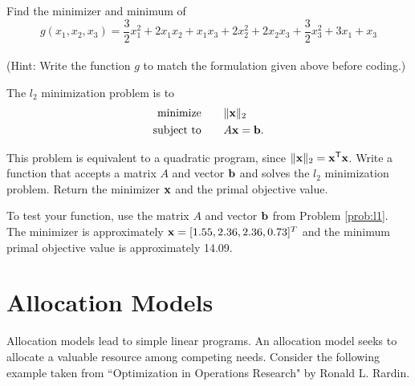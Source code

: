\begin{problem}
Find the minimizer and minimum of
\begin{equation*}
g(x_1,x_2,x_3) = \frac{3}{2}x_1^2 +2x_1x_2 + x_1x_3+ 2x_2^2 +2x_2x_3+\frac{3}{2}x_3^2+3x_1 + x_3
\end{equation*}
\\(Hint: Write the function $g$ to match the formulation given above before coding.)
\begin{comment}
\begin{equation}
f(x) = \frac{1}{2}x\trp Qx - x\trp p
\end{equation}
where

\begin{center}
$Q =
\begin{bmatrix}
3 & 2 & 1\\
2 & 4 & 2\\
1 & 2 & 3\\
\end{bmatrix}
$
and $p =
\begin{bmatrix}
3\\
0\\
1\\
\end{bmatrix}
$
\end{center}
\end{comment}

\end{problem}


\begin{problem}
The $l_2$ minimization problem is to
\begin{align*}
\text{minimize}\qquad &\|\mathbf{x}\|_2\\
\text{subject to} \qquad &A\mathbf{x} = \mathbf{b}.
\end{align*}

This problem is equivalent to a quadratic program, since $\|\mathbf{x}\|_2 = \mathbf{x}^{\mathsf T} \mathbf{x}$.
Write a function that accepts a matrix $A$ and vector $\mathbf{b}$ and solves the $l_2$ minimization problem.
Return the minimizer $\mathbf{x}$ and the primal objective value.

To test your function, use the matrix $A$ and vector $\mathbf{b}$ from Problem \ref{prob:l1}. 
The minimizer is approximately $\mathbf{x}=[1.55, 2.36, 2.36, 0.73]^T$ and the minimum primal objective value is approximately 14.09.
\end{problem}

\section*{Allocation Models}
Allocation models lead to simple linear programs. An allocation model seeks to allocate a valuable resource among competing needs. Consider the following example taken from ``Optimization in Operations Research" by Ronald L. Rardin. %

